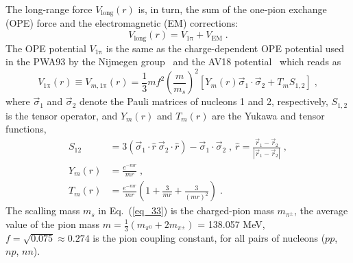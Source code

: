 The long-range force $V_{\mathrm{long}}(r)$ is, in turn, the sum of the one-pion exchange (OPE) force and the electromagnetic (EM) corrections:
\begin{equation}
V_{\mathrm{long}}(r) = V_{\mathrm{1\pi}} + V_{\mathrm{EM}}\;.
\label{eq_32}
\end{equation}
The OPE potential $V_{\mathrm{1\pi}}$ is the same as the charge-dependent OPE potential used in the PWA93 by the Nijmegen group~\cite{Stoks1993} and the AV18 potential~\cite{Wiringa1995} which reads as
\begin{equation}
V_{\mathrm{\mathrm{1\pi}}}(r) \equiv V_{m, \mathrm{\mathrm{1\pi}}}(r) = \frac{1}{3}mf^{2}\left(\frac{m}{m_{s}}\right)^{2}\left[Y_{m}(r)\vec{\sigma}_{1}\cdot\vec{\sigma}_{2} + T_{m}S_{1,2}\right]\;,
\label{eq_33}
\end{equation}
where $\vec{\sigma}_{1}$ and $\vec{\sigma}_{2}$ denote the Pauli matrices of nucleons 1 and 2, respectively, $S_{1,2}$ is the tensor operator, and $Y_{m}(r)$ and $T_{m}(r)$ are the Yukawa and tensor functions,
\begin{equation}
\begin{split}
S_{12} &= 3\left(\vec{\sigma}_{1}\cdot\hat{r}~\vec{\sigma}_{2}\cdot\hat{r}\right) - \vec{\sigma}_{1}\cdot\vec{\sigma}_{2}\;,~\hat{r} = \frac{\vec{r}_{1} - \vec{r}_{2}}{\left|\vec{r}_{1} - \vec{r}_{2}\right|}\;, \\
Y_{m}(r) &= \frac{e^{-mr}}{mr}\;,\\
T_{m}(r) &= \frac{e^{-mr}}{mr}\left(1 + \frac{3}{mr} + \frac{3}{(mr)^{2}}\right)\;.
\end{split}
\label{eq_34}
\end{equation}
The scalling mass $m_s$ in Eq.~(\ref{eq_33}) is the charged-pion mass $m_{\pi^{\pm}}$, the average value of the pion mass $m = \frac{1}{3}(m_{\pi^{0}} + 2m_{\pi^{\pm}})$ = 138.057 MeV, $f = \sqrt{0.075} \approx 0.274$ is the pion coupling constant, for all pairs of nucleons ($pp$, $np$, $nn$). 
